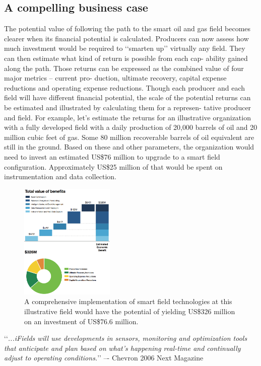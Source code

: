 \documentclass[twocolumn]{article}
\begin{document}
\subsection{A compelling business case}
The potential value of following the path to the smart oil
and gas field becomes clearer when its financial potential is calculated. Producers can now assess how much investment would be required to \lq\lq{}smarten up\rq\rq{} virtually any field. They can then estimate what kind of return is possible from each cap- ability gained along the path. Those returns can be expressed as the combined value of four major metrics – current pro- duction, ultimate recovery, capital expense reductions and operating expense reductions.
Though each producer and each field will have different financial potential, the scale of the potential returns can be estimated and illustrated by calculating them for a represen- tative producer and field. For example, let’s estimate the returns for an illustrative organization with a fully developed field with a daily production of 20,000 barrels of oil and
20 million cubic feet of gas. Some 80 million recoverable barrels of oil equivalent are still in the ground.
Based on these and other parameters, the organization would need to invest an estimated US\$76 million to upgrade to a smart field configuration. Approximately US\$25 million of that would be spent on instrumentation and data collection.

\begin{figure}[htb]
      \centering
      \includegraphics[width=0.4\textwidth]{figure02}
      \caption{A comprehensive implementation of smart field technologies at this illustrative field would have the potential of yielding US\$326 million on an investment of US\$76.6 million.}
      \label{fig2}
\end{figure}

\lq\lq{}\emph{...iFields will use developments in sensors, monitoring and optimization tools that anticipate and plan based on what’s happening real-time and continually adjust to operating conditions.}\rq\rq{}
–- Chevron 2006 Next Magazine
\end{document}
